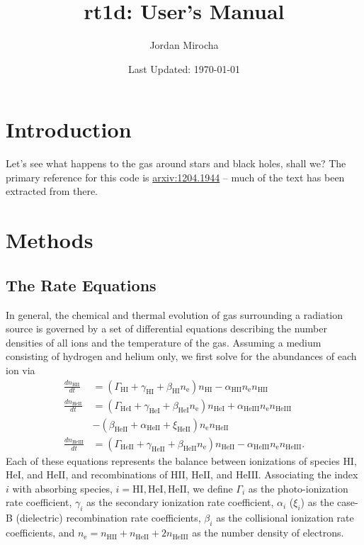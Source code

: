 \documentclass[letterpaper,titlepage,12pt]{article}
\numberwithin{equation}{section}
\newcommand{\HI}{\text{HI}}
\newcommand{\HII}{\text{HII}}
\newcommand{\HeI}{\text{HeI}}
\newcommand{\HeII}{\text{HeII}}
\newcommand{\HeIII}{\text{HeIII}}
\newcommand{\nHI}{n_{\text{HI}}}
\newcommand{\nHII}{n_{\text{HII}}}
\newcommand{\nHeI}{n_{\text{HeI}}}
\newcommand{\nHeII}{n_{\text{HeII}}}
\newcommand{\nHeIII}{n_{\text{HeIII}}}
\newcommand{\nel}{n_{\text{e}}}
\newcommand{\gHI}{\Gamma_{\text{HI}}}
\newcommand{\gHeI}{\Gamma_{\text{HeI}}}
\newcommand{\gHeII}{\Gamma_{\text{HeII}}}
\newcommand{\aHII}{\alpha_{\text{HII}}}
\newcommand{\aHeII}{\alpha_{\text{HeII}}}
\newcommand{\aHeIII}{\alpha_{\text{HeIII}}}
\newcommand{\bHI}{\beta_{\text{HI}}}
\newcommand{\bHeI}{\beta_{\text{HeI}}}
\newcommand{\bHeII}{\beta_{\text{HeII}}}
\newcommand{\xiHeII}{\xi_{\text{HeII}}}
\begin{document}
\author{Jordan Mirocha}	
\title{\Large {\bf rt1d: User's Manual}}
\date{Last Updated: \today}
\maketitle

\setcounter{tocdepth}{2}
\tableofcontents
\newpage

\section{Introduction}
Let's see what happens to the gas around stars and black holes, shall we? The
primary reference for this code is
\href{http://arxiv.org/abs/1204.1944}{arxiv:1204.1944} -- much of the text has
been extracted from there.

\section{Methods}

\subsection{The Rate Equations}
In general, the chemical and thermal evolution of gas surrounding a radiation
source is governed by a set of differential equations describing the number
densities of all ions and the temperature of the gas. Assuming a medium
consisting of hydrogen and helium only, we first solve for the abundances of
each ion via
\begin{align}
    \frac{d \nHII}{dt} & = (\gHI + \gamma_{\HI} + \bHI \nel) \nHI - \aHII \nel \nHII   \label{eq:HIIRateEquation} \\ 
    \frac{d \nHeII}{dt} & = (\gHeI + \gamma_{\HeI} + \bHeI \nel) \nHeI \nonumber + \aHeIII \nel \nHeIII \\  & - (\bHeII + \aHeII + \xiHeII) \nel \nHeII \label{eq:HeIIRateEquation} \\ 
    \frac{d \nHeIII}{dt} & = (\gHeII + \gamma_{\HeII} + \bHeII \nel) \nHeII  - \aHeIII \nel \nHeIII . \label{eq:HeIIIRateEquation}
\end{align}
Each of these equations represents the balance between ionizations of species
$\HI$, $\HeI$, and $\HeII$, and recombinations of $\HII$, $\HeII$, and
$\HeIII$. Associating the index $i$ with absorbing species, $i = \HI, \HeI,
\HeII$, we define $\Gamma_i$ as the photo-ionization rate coefficient,
$\gamma_i$ as the secondary ionization rate coefficient, $\alpha_i$ ($\xi_i$)
as the case-B (dielectric) recombination rate coefficients, $\beta_i$ as the
collisional ionization rate coefficients, and $\nel = \nHII + \nHeII +
2\nHeIII$ as the number density of electrons.
\end{document}
